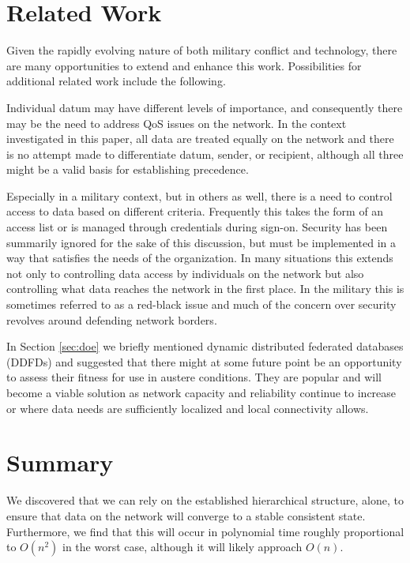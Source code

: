 \documentclass[10pt]{./IEEEtran}
\begin{document}
\section{Related Work}
\label{sec:related}
Given the rapidly evolving nature of both military conflict and technology, there are many opportunities to extend and enhance this work.  Possibilities for additional related work include the following.

Individual datum may have different levels of importance, and consequently there may be the need to address QoS issues on the network.  In the context investigated in this paper, all data are treated equally on the network and there is no attempt made to differentiate datum, sender, or recipient, although all three might be a valid basis for establishing precedence.

Especially in a military context, but in others as well, there is a need to control access to data based on different criteria.  Frequently this takes the form of an access list or is managed through credentials during sign-on.  Security has been summarily ignored for the sake of this discussion, but must be implemented in a way that satisfies the needs of the organization.  In many situations this extends not only to controlling data access by individuals on the network but also controlling what data reaches the network in the first place.  In the military this is sometimes referred to as a red-black issue and much of the concern over security revolves around defending network borders.
	
In Section \ref{sec:doe} we briefly mentioned dynamic distributed federated databases (DDFDs) and suggested that there might at some future point be an opportunity to assess their fitness for use in austere conditions.  They are popular and will become a viable solution as network capacity and reliability continue to increase or where data needs are sufficiently localized and local connectivity allows.


\section{Summary}
\label{sec:conclusion}
We discovered that we can rely on the established hierarchical structure, alone, to ensure that data on the network will converge to a stable consistent state.  Furthermore, we find that this will occur in polynomial time roughly proportional to $O(n^{2})$ in the worst case, although it will likely approach $O(n)$.  
\end{document}
